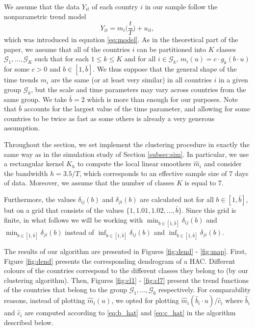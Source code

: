 \documentclass[a4paper,11pt]{article}
\numberwithin{equation}{section}
\begin{document}
We assume that the data $Y_{it}$ of each country $i$ in our sample follow the nonparametric trend model 
\[ Y_{it} = m_i\Big(\frac{t}{T}\Big) + u_{it}, \]
which was introduced in equation \eqref{eq:model}. As in the theoretical part of the paper, we assume that all of the countries $i$ can be partitioned into $K$ classes $\mathcal{G}_1, \ldots, \mathcal{G}_K$ such that for each $1 \leq k\leq K$ and for all $i \in \mathcal{G}_k$, $m_i(u) = c \cdot g_k(b \cdot u)$ for some $c>0$ and $b\in[1, \bar{b}]$. We thus suppose that the general shape of the time trends $m_i$ are the same (or at least very similar) in all countries $i$ in a given group $\mathcal{G}_k$, but the scale and time parameters may vary across countries from the same group. We take $\bar{b} = 2$ which is more than enough for our purposes. Note that $\bar{b}$ accounts for the largest value of the time parameter, and allowing for some countries to be twice as fast as some others is already a very generous assumption.

Throughout the section, we set implement the clustering procedure in exactly the same way as in the simulation study of Section \ref{subsec:sim}. In particular, we use a rectangular kernel $K_h$ to compute the local linear smoothers $\hat{m}_{i}$ and consider the bandwidth $h = 3.5/T$, which corresponds to an effective sample size of $7$ days of data. Moreover, we assume that the number of classes $K$ is equal to $7$.

Furthermore, the values $\delta_{ij}(b)$ and $\delta_{ji}(b)$ are calculated not for all $b\in [1, \bar{b}]$, but on a grid that consists of the values $\{1, 1.01, 1.02, \ldots, \bar{b}\}$. Since this grid is finite, in what follows we will be working with $\min_{b \in [1, \bar{b}]} \delta_{ij}(b)$ and $\min_{b \in [1, \bar{b}]} \delta_{ji}(b)$ instead of $\inf_{b \in [1, \bar{b}]} \delta_{ij}(b)$ and $\inf_{b \in [1, \bar{b}]} \delta_{ji}(b)$.

The results of our algorithm are presented in Figures \ref{fig:dend} - \ref{fig:map}. First, Figure \ref{fig:dend} presents the corresponding dendrogram of a HAC. Different colours of the countries correspond to the different classes they belong to (by our clustering algorithm). Then, Figures \ref{fig:cl1} - \ref{fig:cl7} present the trend functions of the countries that belong to the group $\mathcal{G}_1, \ldots, \mathcal{G}_6$ respectively. For comparability reasons, instead of plotting $\hat{m}_i(u)$, we opted for plotting $\hat{m}_i(\hat{b}_i \cdot u) / \hat{c}_i$ where $\hat{b}_i$ and $\hat{c}_i$ are computed according to \eqref{eq:b_hat} and \eqref{eq:c_hat} in the algorithm described below.
\end{document}
